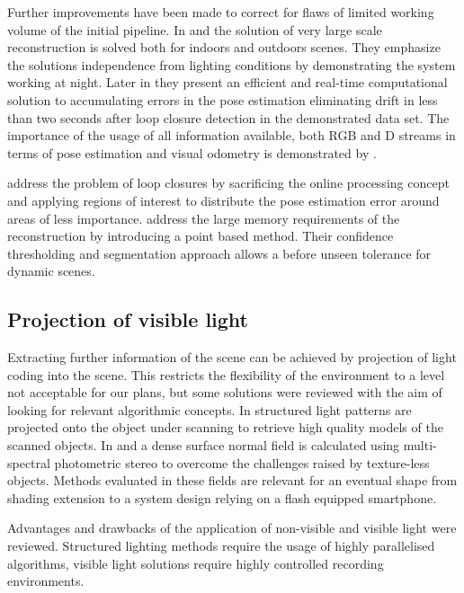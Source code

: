 \documentclass{ucl_thesis}
\begin{document}
\par Further improvements have been made to correct for flaws of limited working volume of the initial pipeline. In \citep{Whelan12rssw} and \citep{Chen:2013:Scalable_volumetric} the solution of very large scale reconstruction is solved both for indoors and outdoors scenes. They emphasize the solutions independence from lighting conditions by demonstrating the system working at night. Later in \citep{Whelan13iros} they present an efficient and real-time computational solution to accumulating errors in the pose estimation eliminating drift in less than two seconds after loop closure detection in the demonstrated data set. The importance of the usage of all information available, both RGB and D streams in terms of pose estimation and visual odometry is demonstrated by \citep{Whelan13icra}.

\par \citep{Zhou:2013} address the problem of loop closures by sacrificing the online processing concept and applying regions of interest to distribute the pose estimation error around areas of less importance. \citep{keller13realtime} address the large memory requirements of the reconstruction by introducing a point based method. Their confidence thresholding and segmentation approach allows a before unseen tolerance for dynamic scenes.

\subsection{Projection of visible light}
Extracting further information of the scene can be achieved by projection of light coding into the scene. This restricts the flexibility of the environment to a level not acceptable for our plans, but some solutions were reviewed with the aim of looking for relevant algorithmic concepts. In \cite{DBLP:journals/tog/RusinkiewiczHL02} structured light patterns are projected onto the object under scanning to retrieve high quality models of the scanned objects. In \cite{HernandezEtc_ICCV07} and \cite{pami/BrostowHVSC11/VideoNormals} a dense surface normal field is calculated using multi-spectral photometric stereo to overcome the challenges raised by texture-less objects. Methods evaluated in these fields are relevant for an eventual shape from shading extension to a system design relying on a flash equipped smartphone.\\

\par Advantages and drawbacks of the application of non-visible and visible light were reviewed. Structured lighting methods require the usage of highly parallelised algorithms, visible light solutions require highly controlled recording environments. 
\end{document}
